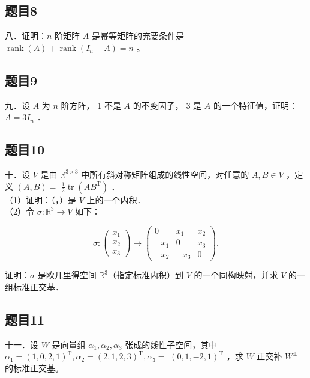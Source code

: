 \documentclass{article}
\begin{document}
\subsection{题目8}
八．证明：\(n\) 阶矩阵 \(A\) 是幂等矩阵的充要条件是 \(\operatorname{rank}(A)+\operatorname{rank}\left(I_{n}-A\right)=n\) 。

\subsection{题目9}
九．设 \(A\) 为 \(n\) 阶方阵， 1 不是 \(A\) 的不变因子， 3 是 \(A\) 的一个特征值，证明：\(A=3 I_{n}\) ．

\subsection{题目10}
十．设 \(V\) 是由 \(\mathbb{R}^{3 \times 3}\) 中所有斜对称矩阵组成的线性空间，对任意的 \(A, B \in V\) ，定义 \((A, B)=\) \(\frac{1}{2} \operatorname{tr}\left(A B^{\mathrm{T}}\right)\) ．\\
（1）证明：（，）是 \(V\) 上的一个内积．\\
（2）令 \(\sigma: \mathbb{R}^{3} \rightarrow V\) 如下：

\[
\sigma:\left(\begin{array}{l}
x_{1} \\
x_{2} \\
x_{3}
\end{array}\right) \mapsto\left(\begin{array}{ccc}
0 & x_{1} & x_{2} \\
-x_{1} & 0 & x_{3} \\
-x_{2} & -x_{3} & 0
\end{array}\right) .
\]

证明：\(\sigma\) 是欧几里得空间 \(\mathbb{R}^{3}\)（指定标准内积）到 \(V\) 的一个同构映射，并求 \(V\) 的一组标准正交基．

\subsection{题目11}
十一．设 \(W\) 是向量组 \(\alpha_{1}, \alpha_{2}, \alpha_{3}\) 张成的线性子空间，其中 \(\alpha_{1}=(1,0,2,1)^{\mathrm{T}}, \alpha_{2}=(2,1,2,3)^{\mathrm{T}}, \alpha_{3}=\) \((0,1,-2,1)^{\mathrm{T}}\) ，求 \(W\) 正交补 \(W^{\perp}\) 的标准正交基。
\end{document}
